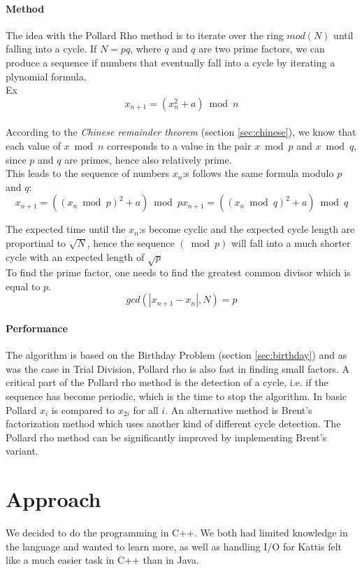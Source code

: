 \documentclass[a4paper, 12pt]{report}
\begin{document}
\subsubsection{Method}
The idea with the Pollard Rho method is to iterate over the ring $mod(N)$ until falling into a cycle. If $N = pq$, where $q$ and $q$ are two prime factors, we can produce a sequence if numbers that eventually fall into a cycle by iterating a plynomial formula. \\
Ex 
\begin{equation}
x_{n+1} = (x_n^2 + a) \bmod n
\end{equation} \\
According to the \emph{Chinese remainder theorem} (section \ref{sec:chinese}), we know that each value of $x \bmod n$ corresponds to a value in the pair $x \bmod p$ and $x \bmod q$, since $p$ and $q$ are primes, hence also relatively prime. 
\\
This leads to the sequence of numbers $x_n$:s follows the same formula modulo $p$ and $q$:
\begin{equation}
	x_{n+1} = ((x_n \bmod p)^2 + a) \bmod p
	x_{n+1} = ((x_n \bmod q)^2 + a) \bmod q
\end{equation}

The expected time until the $x_n$:s become cyclic and the expected cycle length are proportinal to $\sqrt{N}$, hence the sequence $(\bmod p)$ will fall into a much shorter cycle with an expected length of $\sqrt{p}$
\\
To find the prime factor, one needs to find the greatest common divisor which is equal to $p$.
\begin{equation}
gcd(|x_{n+1} - x_n|, N) = p
\end{equation}
\subsubsection{Performance}
The algorithm is based on the Birthday Problem (section \ref{sec:birthday}) and as was the case in Trial Division, Pollard rho is also fast in finding small factors. A critical part of the Pollard rho method is the detection of a cycle, i.e. if the sequence has become periodic, which is the time to stop the algorithm. In basic Pollard $x_i$ is compared to $x_{2i}$ for all $i$. An alternative method is Brent's factorization method which uses another kind of different cycle detection. The Pollard rho method can be significantly improved by implementing Brent's variant.


\chapter{Approach}
We decided to do the programming in C++. We both had limited knowledge in the language and wanted to learn more, as well as handling I/O for Kattis felt like a much easier task in C++ than in Java. 
\end{document}
